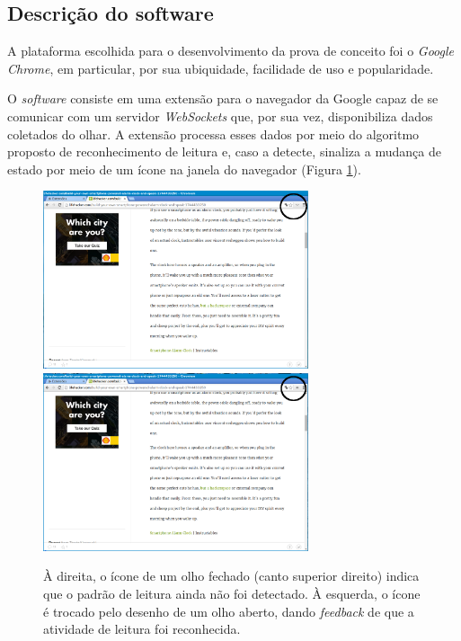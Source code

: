 \documentclass[12pt]{article}
\begin{document}
		
		\subsection{Descrição do software}
		A plataforma escolhida para o desenvolvimento da prova de conceito foi o \textit{Google Chrome}, em particular, por sua ubiquidade, facilidade de uso e popularidade.
		
		O \textit{software} consiste em uma extensão para o navegador da Google capaz de se comunicar com um servidor \textit{WebSockets} que, por sua vez, disponibiliza dados coletados do olhar. A extensão processa esses dados por meio do algoritmo proposto de reconhecimento de leitura e, caso a detecte, sinaliza a mudança de estado por meio de um ícone na janela do navegador (Figura \ref{fig:pocface1}).
		
		\begin{figure}[!ht]
			\centering
			\includegraphics[width=7.8cm]{imgs/poc_fechado.png}
			\includegraphics[width=7.8cm]{imgs/poc_aberto.png}
			\caption{\footnotesize {À direita, o ícone de um olho fechado (canto superior direito) indica que o padrão de leitura ainda não foi detectado. À esquerda, o ícone é trocado pelo desenho de um olho aberto, dando \textit{feedback} de que a atividade de leitura foi reconhecida.}}
			\label{fig:pocface1}
			\vspace{5mm}
		\end{figure}
		
\end{document}
